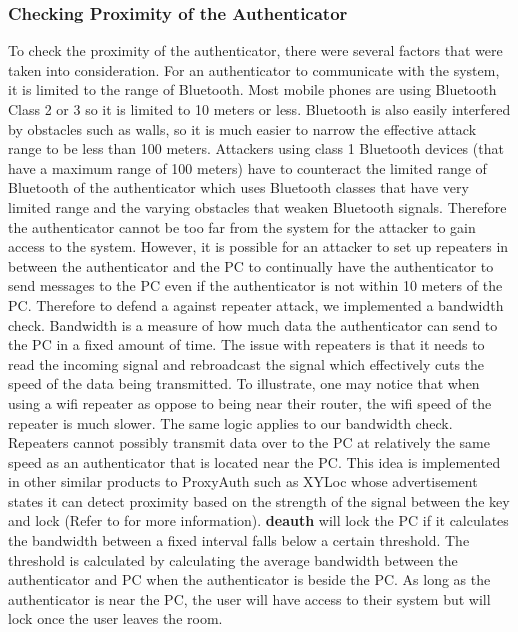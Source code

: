 \documentclass[letterpaper,twocolumn,10pt]{article}
\begin{document}
{{\subsubsection{Checking Proximity of the Authenticator}
To check the proximity of the authenticator, there were several factors that were taken into consideration. For an authenticator to communicate with the system, it is limited to the range of Bluetooth. Most mobile phones are using Bluetooth Class 2 or 3 so it is limited to 10 meters or less. Bluetooth is also easily interfered by obstacles such as walls, so it is much easier to narrow the effective attack range to be less than 100 meters. Attackers using class 1 Bluetooth devices (that have a maximum range of 100 meters) have to counteract the limited range of Bluetooth of the authenticator which uses Bluetooth classes that have very limited range and the varying obstacles that weaken Bluetooth signals. Therefore the authenticator cannot be too far from the system for the attacker to gain access to the system. However, it is possible for an attacker to set up repeaters in between the authenticator and the PC to continually have the authenticator to send messages to the PC even if the authenticator is not within 10 meters of the PC. Therefore to defend a against repeater attack, we implemented a bandwidth check. Bandwidth is a measure of how much data the authenticator can send to the PC in a fixed amount of time. The issue with repeaters is that it needs to read the incoming signal and rebroadcast the signal which effectively cuts the speed of the data being transmitted. To illustrate, one may notice that when using a wifi repeater as oppose to being near their router, the wifi speed of the repeater is much slower. The same logic applies to our bandwidth check. Repeaters cannot possibly transmit data over to the PC at relatively the same speed as an authenticator that is located near the PC. This idea is implemented in other similar products to ProxyAuth such as XYLoc whose advertisement states it can detect proximity based on the strength of the signal between the key and lock (Refer to  for more information). \textbf{deauth} will lock the PC if it calculates the bandwidth between a fixed interval falls below a certain threshold. The threshold is calculated by calculating the average bandwidth between the authenticator and PC when the authenticator is beside the PC. As long as the authenticator is near the PC, the user will have access to their system but will lock once the user leaves the room.

}}
\end{document}
